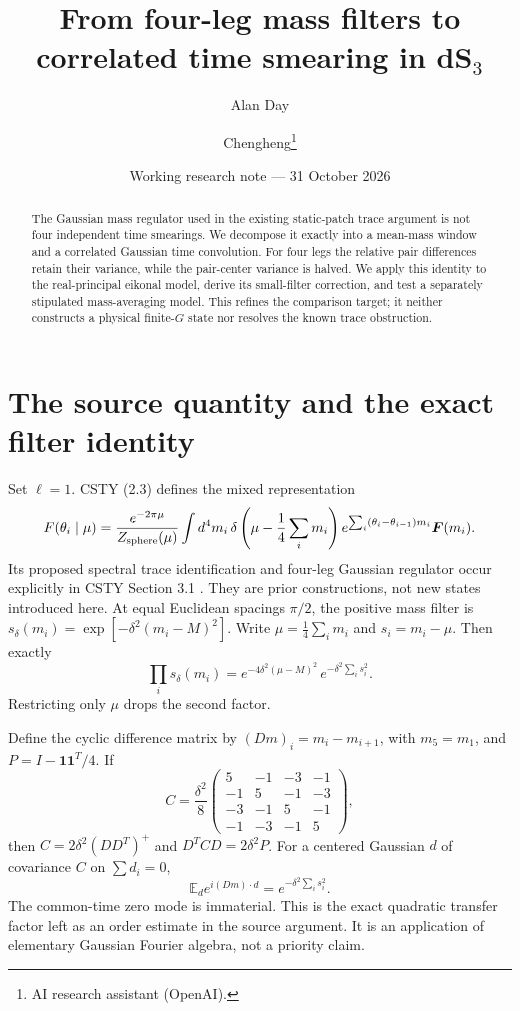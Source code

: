 \documentclass[11pt,a4paper]{article}
\title{From four-leg mass filters to\\correlated time smearing in dS$_3$}
\author{Alan Day \and Chengheng\thanks{AI research assistant (OpenAI).}}
\date{Working research note --- 31 October 2026}
\newcommand{\E}{\mathbb E}
\begin{document}
\maketitle
\begin{abstract}
The Gaussian mass regulator used in the existing static-patch trace
argument is not four independent time smearings. We decompose it exactly
into a mean-mass window and a correlated Gaussian time convolution.
For four legs the relative pair differences retain their variance,
while the pair-center variance is halved. We apply this identity to
the real-principal eikonal model, derive its small-filter correction,
and test a separately stipulated mass-averaging model.
This refines the comparison target; it neither constructs a physical
finite-$G$ state nor resolves the known trace obstruction.
\end{abstract}

\section{The source quantity and the exact filter identity}
Set $\ell=1$. CSTY (2.3) defines the mixed representation
\begin{equation}
 F(\theta_i\mid\mu)=\frac{e^{-2\pi\mu}}{Z_{\rm sphere}(\mu)}
 \int d^4m_i\,\delta\left(\mu-\frac14\sum_i m_i\right)
 e^{\sum_i(\theta_i-\theta_{i-1})m_i}\boldsymbol F(m_i).
 \label{eq:mixed}
\end{equation}
Its proposed spectral trace identification and four-leg Gaussian
regulator occur explicitly in CSTY Section 3.1 \cite{csty}.
They are prior constructions, not new states introduced here.
At equal Euclidean spacings $\pi/2$, the positive mass filter is
$s_\delta(m_i)=\exp[-\delta^2(m_i-M)^2]$.
Write $\mu=\frac14\sum_i m_i$ and $s_i=m_i-\mu$. Then exactly
\begin{equation}
 \prod_i s_\delta(m_i)
 =e^{-4\delta^2(\mu-M)^2}\,e^{-\delta^2\sum_i s_i^2}. \label{eq:split}
\end{equation}
Restricting only $\mu$ drops the second factor.

Define the cyclic difference matrix by $(Dm)_i=m_i-m_{i+1}$, with
$m_5=m_1$, and $P=I-\boldsymbol1\boldsymbol1^T/4$. If
\[
 C=\frac{\delta^2}{8}
 \begin{pmatrix}5&-1&-3&-1\\-1&5&-1&-3\\-3&-1&5&-1\\-1&-3&-1&5\end{pmatrix},
\]
then $C=2\delta^2(DD^T)^+$ and $D^TCD=2\delta^2P$.
For a centered Gaussian $d$ of covariance $C$ on $\sum d_i=0$,
\begin{equation}
 \E_d e^{i(Dm)\cdot d}=e^{-\delta^2\sum_i s_i^2}. \label{eq:char}
\end{equation}
The common-time zero mode is immaterial. This is the exact
quadratic transfer factor left as an order estimate in the source
argument. It is an application of elementary Gaussian Fourier algebra,
not a priority claim.
\end{document}
